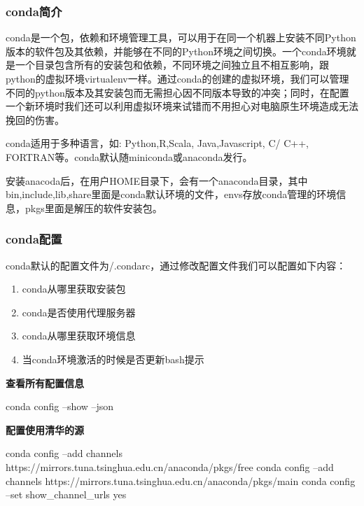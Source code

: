 \subsubsection{conda简介}

conda是一个包，依赖和环境管理工具，可以用于在同一个机器上安装不同Python版本的软件包及其依赖，并能够在不同的Python环境之间切换。一个conda环境就是一个目录包含所有的安装包和依赖，不同环境之间独立且不相互影响，跟python的虚拟环境virtualenv一样。通过conda的创建的虚拟环境，我们可以管理不同的python版本及其安装包而无需担心因不同版本导致的冲突；同时，在配置一个新环境时我们还可以利用虚拟环境来试错而不用担心对电脑原生环境造成无法挽回的伤害。

conda适用于多种语言，如: Python,R,Scala, Java,Javascript, C/ C++, FORTRAN等。conda默认随miniconda或anaconda发行。

安装anacoda后，在用户HOME目录下，会有一个anaconda目录，其中bin,include,lib,share里面是conda默认环境的文件，envs存放conda管理的环境信息，pkgs里面是解压的软件安装包。

\subsubsection{conda配置}

conda默认的配置文件为\texttildelow /.condarc，通过修改配置文件我们可以配置如下内容：

\begin{enumerate}
\item conda从哪里获取安装包

\item conda是否使用代理服务器

\item conda从哪里获取环境信息

\item 当conda环境激活的时候是否更新bash提示
\end{enumerate}

\textbf{查看所有配置信息}

\begin{tcode}
	conda config --show --json
\end{tcode}

\textbf{配置使用清华的源}

\begin{tcode}
	conda config --add channels https://mirrors.tuna.tsinghua.edu.cn/anaconda/pkgs/free
	conda config --add channels https://mirrors.tuna.tsinghua.edu.cn/anaconda/pkgs/main
	conda config --set show_channel_urls yes
\end{tcode}

